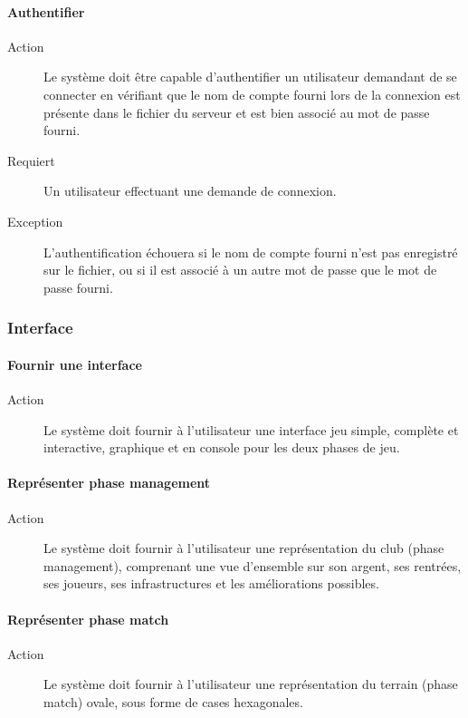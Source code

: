 \documentclass[a4paper]{article}
\begin{document}
\paragraph{Authentifier}
\begin{description}
\item[Action] Le système doit être capable d'authentifier un \gls{utilisateur} demandant de se connecter en vérifiant que le nom de compte fourni lors de la connexion est présente dans le fichier du \gls{serveur} et est bien associé au mot de passe fourni.
\item[Requiert] Un \gls{utilisateur} effectuant une demande de connexion.
\item[Exception] L'authentification échouera si le nom de compte fourni n'est pas enregistré sur le fichier, ou si il est associé à un autre mot de passe que le mot de passe fourni.
\end{description}

\subsubsection{Interface}
\paragraph{Fournir une interface}
\begin{description}
\item[Action] Le système doit fournir à l'\gls{utilisateur} une interface jeu simple, complète et interactive, graphique et en console pour les deux phases de jeu.
\end{description}

\paragraph{Représenter phase management}
\begin{description}
\item[Action] Le système doit fournir à l'\gls{utilisateur} une représentation du \gls{club} (phase management), comprenant une vue d'ensemble sur son argent, ses rentrées, ses \glspl{joueur}, ses infrastructures et les améliorations possibles.
\end{description}

\paragraph{Représenter phase match}
\begin{description}
\item[Action] Le système doit fournir à l'\gls{utilisateur} une représentation du terrain (phase match) ovale, sous forme de cases hexagonales.
\end{description}
\end{document}
